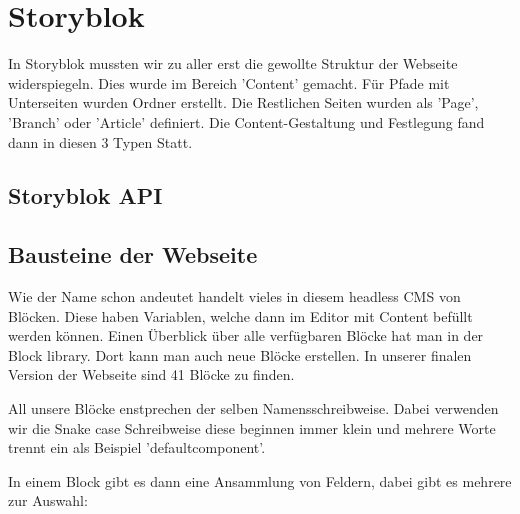 

\section{Storyblok}

In Storyblok mussten wir zu aller erst die gewollte Struktur der Webseite widerspiegeln. Dies wurde im Bereich 'Content' gemacht. 
Für Pfade mit Unterseiten wurden Ordner erstellt. Die Restlichen Seiten wurden als 'Page', 'Branch' oder 'Article' definiert.
Die Content-Gestaltung und Festlegung fand dann in diesen 3 Typen Statt. 


\subsection{Storyblok API}

\subsection{Bausteine der Webseite}
Wie der Name schon andeutet handelt vieles in diesem headless CMS von Blöcken. Diese haben Variablen, welche dann im Editor mit Content befüllt werden können. 
Einen Überblick über alle verfügbaren Blöcke hat man in der Block library. Dort kann man auch neue Blöcke erstellen. In unserer finalen Version der Webseite sind 41 Blöcke zu finden. 

All unsere Blöcke enstprechen der selben Namensschreibweise. Dabei verwenden wir die Snake case Schreibweise diese beginnen immer klein und mehrere Worte trennt ein \textunderscore  als Beispiel 'default\textunderscore component'.

In einem Block gibt es dann eine Ansammlung von Feldern, dabei gibt es mehrere zur Auswahl:

